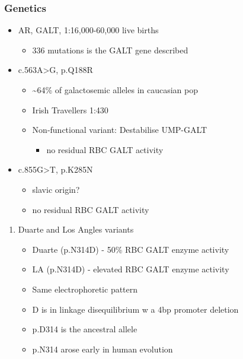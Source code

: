 \documentclass{scrartcl}
\begin{document}
\subsubsection{Genetics}
\label{sec:org2210cd9}
\begin{itemize}
\item AR, GALT, 1:16,000-60,000 live births
\begin{itemize}
\item 336 mutations is the GALT gene described
\end{itemize}
\item c.563A>G, p.Q188R
\begin{itemize}
\item \textasciitilde{}64\% of galactosemic alleles in caucasian pop
\item Irish Travellers 1:430
\item Non-functional variant: Destabilise UMP-GALT
\begin{itemize}
\item no residual RBC GALT activity
\end{itemize}
\end{itemize}
\item c.855G>T, p.K285N
\begin{itemize}
\item slavic origin?
\item no residual RBC GALT activity
\end{itemize}
\end{itemize}
\begin{enumerate}
\item Duarte and Los Angles variants
\label{sec:org84aba4d}
\begin{itemize}
\item Duarte (p.N314D) - 50\% RBC GALT enzyme activity
\item LA (p.N314D) - elevated RBC GALT enzyme activity
\item Same electrophoretic pattern
\item D is in linkage disequilibrium w a 4bp promoter deletion
\item p.D314 is the ancestral allele
\item p.N314 arose early in human evolution
\end{itemize}
\end{enumerate}
\end{document}
